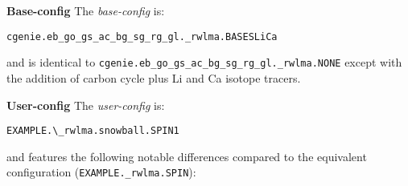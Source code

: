 \documentclass[10pt,twoside]{article}
\begin{document}
\noindent \textbf{Base-config} The \textit{base-config} is:
\vspace{-10pt}\begin{verbatim}cgenie.eb_go_gs_ac_bg_sg_rg_gl._rwlma.BASESLiCa\end{verbatim}\vspace{-10pt}
and is identical to \texttt{cgenie.eb\_go\_gs\_ac\_bg\_sg\_rg\_gl.\_rwlma.NONE} except with the addition of carbon cycle plus Li and Ca isotope tracers.

\noindent \textbf{User-config} The \textit{user-config} is:
\vspace{-10pt}\begin{verbatim}EXAMPLE.\_rwlma.snowball.SPIN1\end{verbatim}\vspace{-10pt}
and features the following notable differences compared to the equivalent configuration (\texttt{EXAMPLE.\_rwlma.SPIN}):
\end{document}
